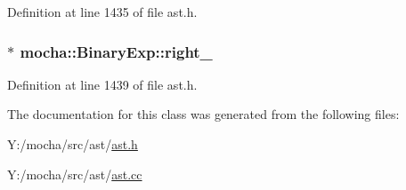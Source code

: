 Definition at line 1435 of file ast.h.

\hypertarget{classmocha_1_1_binary_exp_abf7760f6928cbc7941bb98a658d927fc}{
\subsubsection[{right\_\-}]{$\ast$ {\bf mocha::BinaryExp::right\_\-}}}
\label{classmocha_1_1_binary_exp_abf7760f6928cbc7941bb98a658d927fc}


Definition at line 1439 of file ast.h.



The documentation for this class was generated from the following files:\begin{DoxyCompactItemize}
\item 
Y:/mocha/src/ast/\hyperlink{ast_8h}{ast.h}\item 
Y:/mocha/src/ast/\hyperlink{ast_8cc}{ast.cc}\end{DoxyCompactItemize}
